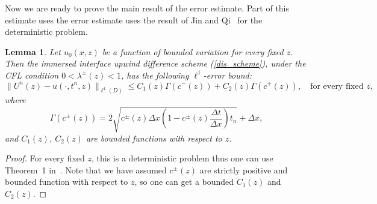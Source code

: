\documentclass[12pt]{article}
\theoremstyle{plain}
\newtheorem{lemma}{Lemma}[section]
\theoremstyle{remark}
\theoremstyle{remark}
\theoremstyle{remark}
\numberwithin{equation}{section}
\newcommand{\Dx}{\Delta x}
\newcommand{\Dt}{\Delta t}
\begin{document}
Now we are ready to prove the main result of the error estimate. Part of this 
estimate uses the error estimate uses the result of Jin and Qi~\cite{Qi:2013byba} for the deterministic problem.

\begin{lemma}\label{lemma}
  Let $u_0(x,z)$ be a function of bounded variation for every fixed $z$. Then the immersed interface upwind difference scheme (\ref{dis_scheme}), under the CFL condition $0 < \lambda^{\pm}(z) < 1$, has the following $\ell^1$-error bound:
  \begin{equation}
    \|U^n(z) - u(\cdot,t^n,z)\|_{\ell^1(D)}\leq C_1(z)\Gamma(c^-(z)) + C_2(z)\Gamma(c^+(z)), \quad\text{for every fixed $z$},
  \end{equation}
  where
  \begin{equation}
  \Gamma(c^{\pm}(z)) = 2\sqrt{c^{\pm}(z)\Dx(1-c^{\pm}(z)\frac{\Dt}{\Dx})t_n} + \Dx,
  \end{equation}
  and $C_1(z)$, $C_2(z)$ are bounded functions with respect to $z$.
\end{lemma}
\begin{proof}
  For every fixed $z$, this is a deterministic problem thus one can use 
 Theorem~1 in~\cite{Qi:2013byba}. Note that we have assumed $c^{\pm}(z)$ are strictly positive and bounded function with respect to $z$, so one can get a bounded $C_1(z)$ and $C_2(z)$.
\end{proof}
\end{document}
